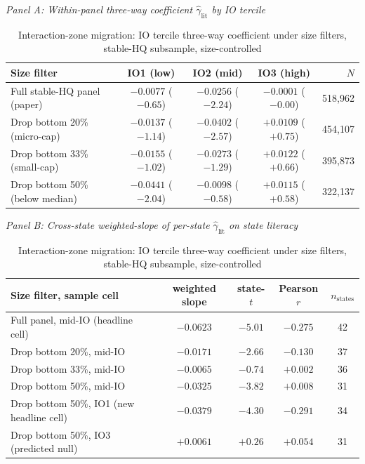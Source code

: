 
\begin{table}[t]
\centering
\caption{Interaction-zone migration: IO tercile three-way coefficient under size filters, stable-HQ subsample, size-controlled}
\label{tab:migration}
\footnotesize
\begin{minipage}{\textwidth}
\centering
\textit{Panel A: Within-panel three-way coefficient $\hat\gamma_{\text{lit}}$ by IO tercile}\\[2pt]
\begin{tabular}{lcccr}
\toprule
Size filter & IO1 (low) & IO2 (mid) & IO3 (high) & $N$ \\
\midrule
Full stable-HQ panel (paper)
  & $-0.0077$ ($-0.65$)
  & $\mathbf{-0.0256}$ ($\mathbf{-2.24}$)
  & $-0.0001$ ($-0.00$)
  & 518,962 \\
Drop bottom 20\% (micro-cap)
  & $-0.0137$ ($-1.14$)
  & $\mathbf{-0.0402}$ ($\mathbf{-2.57}$)
  & $+0.0109$ ($+0.75$)
  & 454,107 \\
Drop bottom 33\% (small-cap)
  & $-0.0155$ ($-1.02$)
  & $-0.0273$ ($-1.29$)
  & $+0.0122$ ($+0.66$)
  & 395,873 \\
Drop bottom 50\% (below median)
  & $\mathbf{-0.0441}$ ($\mathbf{-2.04}$)
  & $-0.0098$ ($-0.58$)
  & $+0.0115$ ($+0.58$)
  & 322,137 \\
\bottomrule
\end{tabular}

\medskip
\textit{Panel B: Cross-state weighted-slope of per-state $\hat\gamma_{\text{lit}}$ on state literacy}\\[2pt]
\begin{tabular}{lcccc}
\toprule
Size filter, sample cell & weighted slope & state-$t$ & Pearson $r$ & $n_{\text{states}}$ \\
\midrule
Full panel, mid-IO (headline cell)
  & $\mathbf{-0.0623}$ & $\mathbf{-5.01}$ & $-0.275$ & 42 \\
Drop bottom 20\%, mid-IO
  & $-0.0171$ & $-2.66$ & $-0.130$ & 37 \\
Drop bottom 33\%, mid-IO
  & $-0.0065$ & $-0.74$ & $+0.002$ & 36 \\
Drop bottom 50\%, mid-IO
  & $-0.0325$ & $-3.82$ & $+0.008$ & 31 \\
\addlinespace
Drop bottom 50\%, IO1 (new headline cell)
  & $\mathbf{-0.0379}$ & $\mathbf{-4.30}$ & $\mathbf{-0.291}$ & 34 \\
Drop bottom 50\%, IO3 (predicted null)
  & $+0.0061$ & $+0.26$ & $+0.054$ & 31 \\
\bottomrule
\end{tabular}
\end{minipage}


\end{table}
